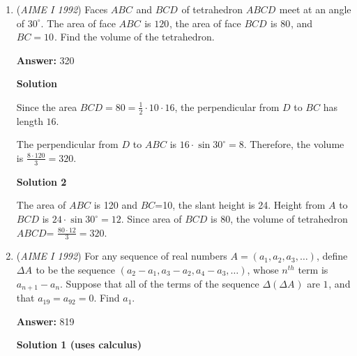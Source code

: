 \begin{enumerate}
 Now, consider the case where the ones digits carry over. In this case, every pair of consecutive integers from $\{1005, 1006, 1007, 1008, 1009\}$ carries over, removing 4 pairs. Since there are 5 possible cases for the tens digit ($0-4$) and 5 possible cases for the hundreds digit, there are $4 \cdot 5 \cdot 5 = 100$ more cases to be excluded.   

 In total, there are $1000 - 499 - 245 - 100 = \boxed{156}$ consecutive pairs.

 


	\item (\textit{AIME I 1992}) Faces $ABC^{}_{}$ and $BCD^{}_{}$ of tetrahedron $ABCD^{}_{}$ meet at an angle of $30^\circ$. The area of face $ABC^{}_{}$ is $120^{}_{}$, the area of face $BCD^{}_{}$ is $80^{}_{}$, and $BC=10^{}_{}$. Find the volume of the tetrahedron.


 
 \textbf{Answer: }320



\textbf{Solution}

Since the area $BCD=80=\frac{1}{2}\cdot10\cdot16$, the perpendicular from $D$ to $BC$ has length $16$.

 The perpendicular from $D$ to $ABC$ is $16 \cdot \sin 30^\circ=8$. Therefore, the volume is $\frac{8\cdot120}{3}=\boxed{320}$.

 



\textbf{Solution 2}

The area of $ABC$ is 120 and $BC$=10, the slant height is 24. Height from $A$ to $BCD$ is $24 \cdot \sin 30^\circ=12$. Since area of $BCD$ is 80, the volume of tetrahedron $ABCD$= $\frac{80\cdot12}{3}=\boxed{320}$.

 


 


	\item (\textit{AIME I 1992}) For any sequence of real numbers $A=(a_1,a_2,a_3,\ldots)$, define $\Delta A^{}_{}$ to be the sequence $(a_2-a_1,a_3-a_2,a_4-a_3,\ldots)$, whose $n^{th}$ term is $a_{n+1}-a_n^{}$. Suppose that all of the terms of the sequence $\Delta(\Delta A^{}_{})$ are $1^{}_{}$, and that $a_{19}=a_{92}^{}=0$. Find $a_1^{}$.


 
 \textbf{Answer: }819



\textbf{Solution 1 (uses calculus)}


\end{enumerate}
